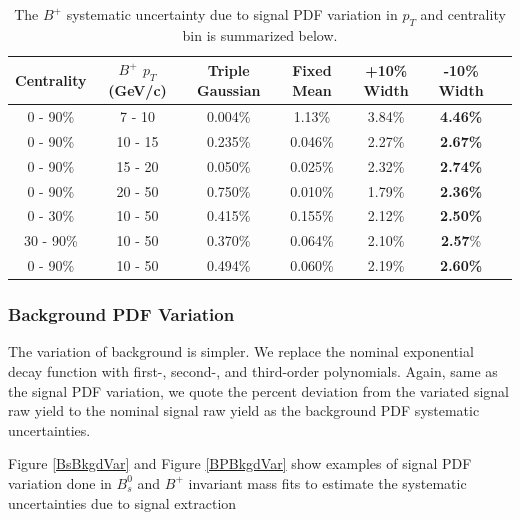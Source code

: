 \begin{table}[h]
\begin{center}
\caption{The $B^+$ systematic uncertainty due to signal PDF variation in $p_T$ and centrality bin is summarized below.}
\vspace{1em}
\label{BPSigVarTable}
  \begin{tabular}{| c | c |c | c| c| c| c| }
    \hline
     Centrality & $B^+$ $p_T$ (GeV/c) & Triple Gaussian &  Fixed Mean & +10\% Width & -10\% Width  \\
    \hline
    \hline
0 - 90\% & 7 - 10 &   0.004\%  &  1.13\% & 3.84\% & \textbf{4.46\%} \\ 
0 - 90\% & 10 - 15 & 0.235\%  & 0.046\%  & 2.27\% &   \textbf{2.67\%}  \\ 
0 - 90\% & 15 - 20 &  0.050\%  & 0.025\%   &  2.32\% & \textbf{2.74\%} \\ 
0 - 90\% & 20 - 50 &  0.750\%  & 0.010\%  &  1.79\%  &   \textbf{2.36\%}\\ 
0 - 30\% & 10 - 50  & 0.415\%  & 0.155\%  &2.12\% &  \textbf{2.50\%} \\ 
30 - 90\% & 10 - 50 &  0.370\% &   0.064\%  & 2.10\% &  \textbf{2.57}\%\\ 
0 - 90\% & 10 - 50 &  0.494\%   & 0.060\%  & 2.19\% &   \textbf{2.60\%} \\ 
    \hline
    \hline
\end{tabular}
\end{center}
\end{table}


\subsubsection{Background PDF Variation}

The variation of background is simpler. We replace the nominal exponential decay function with first-, second-, and third-order polynomials. Again, same as the signal PDF variation, we quote the percent deviation from the variated signal raw yield to the nominal signal raw yield as the background PDF systematic uncertainties.


Figure \ref{BsBkgdVar} and Figure \ref{BPBkgdVar} show examples of signal PDF variation done in $B^0_s$ and $B^+$ invariant mass fits to estimate the systematic uncertainties due to signal extraction


